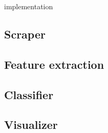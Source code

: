 implementation
\subsection{Scraper}
\subsection{Feature extraction}
\subsection{Classifier}
\subsection{Visualizer}
